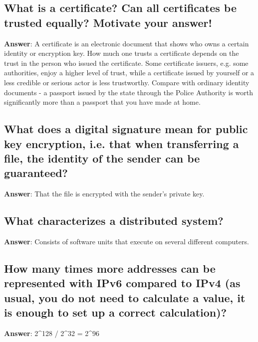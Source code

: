 \documentclass[a4paper,11pt,oneside]{article}
\begin{document}
\begin{sloppypar}
\subsection{What is a certificate? Can all certificates be trusted equally? Motivate your answer!}

\label{q:155:sa:en:True}

\textbf{Answer}: A certificate is an electronic document that shows who owns a certain identity or encryption key. How much one trusts a certificate depends on the trust in the person who issued the certificate. Some certificate issuers, e.g. some authorities, enjoy a higher level of trust, while a certificate issued by yourself or a less credible or serious actor is less trustworthy. Compare with ordinary identity documents - a passport issued by the state through the Police Authority is worth significantly more than a passport that you have made at home.



\subsection{What does a digital signature mean for public key encryption, i.e. that when transferring a file, the identity of the sender can be guaranteed?}

\label{q:156:sa:en:True}

\textbf{Answer}: That the file is encrypted with the sender's private key.



\subsection{What characterizes a distributed system?}

\label{q:157:sa:en:True}

\textbf{Answer}: Consists of software units that execute on several different computers.



\subsection{How many times more addresses can be represented with IPv6 compared to IPv4 (as usual, you do not need to calculate a value, it is enough to set up a correct calculation)?}

\label{q:158:sa:en:True}

\textbf{Answer}: 2^128 / 2^32 = 2^96




\end{sloppypar}
\end{document}
